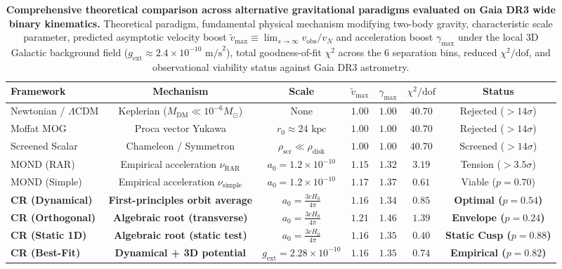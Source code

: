 \documentclass[aps,prd,reprint,superscriptaddress,nofootinbib,floatfix,amsmath,amssymb]{revtex4-2}
\begin{document}
\begin{table}[t]
\caption{\textbf{Comprehensive theoretical comparison across alternative gravitational paradigms evaluated on Gaia DR3 wide binary kinematics.} 
Theoretical paradigm, fundamental physical mechanism modifying two-body gravity, characteristic scale parameter, predicted asymptotic velocity boost $\tilde{v}_{\text{max}} \equiv \lim_{s \to \infty} v_{\text{obs}}/v_N$ and acceleration boost $\gamma_{\text{max}}$ under the local 3D Galactic background field ($g_{\text{ext}} \approx 2.4 \times 10^{-10}\text{ m/s}^2$), total goodness-of-fit $\chi^2$ across the 6 separation bins, reduced $\chi^2/\text{dof}$, and observational viability status against Gaia DR3 astrometry.}
\label{tab:theory_comparison}
\begin{ruledtabular}
\footnotesize
\setlength{\tabcolsep}{3.0pt}
\begin{tabular}{lcccccc}
Framework & Mechanism & Scale & $\tilde{v}_{\text{max}}$ & $\gamma_{\text{max}}$ & $\chi^2 / \text{dof}$ & Status \\
\hline
Newtonian / $\Lambda$CDM & Keplerian ($M_{\text{DM}} \ll 10^{-6} M_\odot$) & None & $1.00$ & $1.00$ & $40.70$ & Rejected ($>14\sigma$) \\
Moffat MOG~\cite{moffat2006scalar} & Proca vector Yukawa & $r_0 \approx 24\text{ kpc}$ & $1.00$ & $1.00$ & $40.70$ & Rejected ($>14\sigma$) \\
Screened Scalar & Chameleon / Symmetron & $\rho_{\text{scr}} \ll \rho_{\text{disk}}$ & $1.00$ & $1.00$ & $40.70$ & Screened ($>14\sigma$) \\
MOND (RAR)~\cite{mcgaugh2016radial} & Empirical acceleration $\nu_{\text{RAR}}$ & $a_0 = 1.2 \times 10^{-10}$ & $1.15$ & $1.32$ & $3.19$ & Tension ($>3.5\sigma$) \\
MOND (Simple)~\cite{famaey2005modified} & Empirical acceleration $\nu_{\text{simple}}$ & $a_0 = 1.2 \times 10^{-10}$ & $1.17$ & $1.37$ & $0.61$ & Viable ($p = 0.70$) \\
\textbf{CR (Dynamical)} & \textbf{First-principles orbit average} & $a_0 = \frac{3 c H_0}{4\pi}$ & $\mathbf{1.16}$ & $\mathbf{1.34}$ & $\mathbf{0.85}$ & \textbf{Optimal ($p = 0.54$)} \\
\textbf{CR (Orthogonal)} & \textbf{Algebraic root (transverse)} & $a_0 = \frac{3 c H_0}{4\pi}$ & $\mathbf{1.21}$ & $\mathbf{1.46}$ & $\mathbf{1.39}$ & \textbf{Envelope ($p = 0.24$)} \\
\textbf{CR (Static 1D)} & \textbf{Algebraic root (static test)} & $a_0 = \frac{3 c H_0}{4\pi}$ & $\mathbf{1.16}$ & $\mathbf{1.35}$ & $\mathbf{0.40}$ & \textbf{Static Cusp ($p = 0.88$)} \\
\textbf{CR (Best-Fit)} & \textbf{Dynamical + 3D potential} & $g_{\text{ext}} = 2.28 \times 10^{-10}$ & $\mathbf{1.16}$ & $\mathbf{1.35}$ & $\mathbf{0.74}$ & \textbf{Empirical ($p = 0.82$)} \\
\end{tabular}
\end{ruledtabular}
\end{table}
\end{document}
